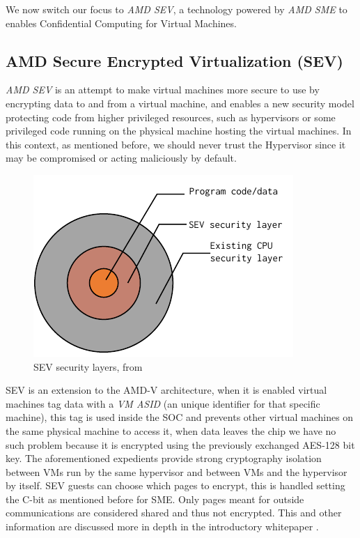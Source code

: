 \documentclass[twocolumn]{article}
\begin{document}
We now switch our focus to \textit{AMD SEV}, a technology powered by \textit{AMD SME} to enables Confidential Computing for Virtual Machines.

\subsection{AMD Secure Encrypted Virtualization (SEV)}

\textit{AMD SEV} is an attempt to make virtual machines more secure to use by encrypting data to and from a virtual machine, and enables a new security model protecting code from higher privileged resources, such as hypervisors or some privileged code running on the physical machine hosting the virtual machines. In this context, as mentioned before, we should never trust the Hypervisor since it may be compromised or acting maliciously by default.

\begin{figure}
    \centering
    \includegraphics[scale=0.9]{img/security-layers.pdf}
    \caption{SEV security layers, from \cite{memory-encryption}}
\end{figure}

SEV is an extension to the AMD-V architecture, when it is enabled virtual machines tag data with a \textit{VM ASID} (an unique identifier for that specific machine), this tag is used inside the SOC and prevents other virtual machines on the same physical machine to access it, when data leaves the chip we have no such problem because it is encrypted using the previously exchanged AES-128 bit key. The aforementioned expedients provide strong cryptography isolation between VMs run by the same hypervisor and between VMs and the hypervisor by itself. SEV guests can choose which pages to encrypt, this is handled setting the C-bit as mentioned before for SME. Only pages meant for outside communications are considered shared and thus not encrypted. This and other information are discussed more in depth in the introductory whitepaper \cite{memory-encryption}.
\end{document}
